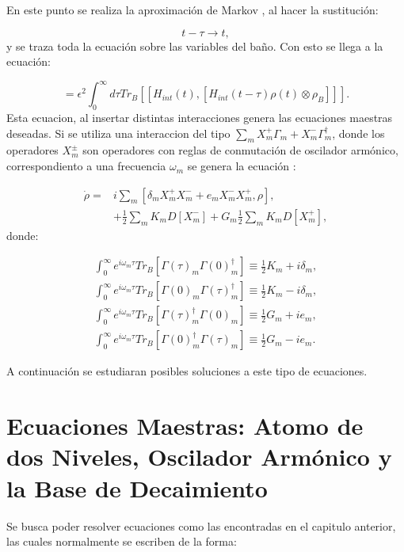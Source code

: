\documentclass[a4paper,10pt]{report}
\begin{document}
En este punto se realiza la aproximación de Markov \cite{ZollerQN}, al hacer la sustitución:

\begin{equation}
t-\tau \rightarrow t,
\end{equation} y se traza toda la ecuación sobre las variables del baño. Con esto se llega a la ecuación:

\begin{equation}
=\epsilon^2 \int_{0}^{\infty}d\tau Tr_B[[H_{int}(t),[H_{int}(t-\tau)\rho(t)\otimes\rho_B]]].
\end{equation} Esta ecuacion, al insertar distintas interacciones genera las ecuaciones maestras deseadas. Si se utiliza una interaccion del tipo $\sum_m X^+_m\Gamma_m + X^-_m\Gamma^\dagger_m$, donde los operadores $X_m^\pm$ son operadores con reglas de conmutación de oscilador armónico, correspondiento a una frecuencia $\omega_m$ se genera la ecuación \cite{ZollerQN}:

\begin{align}
\dot{\rho} =& i\sum_m [\delta_m X^+_m X^-_m + e_mX^-_mX^+_m,\rho],\\
&+ \nonumber \frac{1}{2}\sum_m K_m D[X^-_m] + G_m\frac{1}{2}\sum_m K_m D[X^+_m],
\end{align} donde:

\begin{align}
\int_0 ^\infty e^{i\omega_m \tau}Tr_B[\Gamma(\tau)_m\Gamma(0)^\dagger_m] \equiv \frac{1}{2}K_m+i\delta_m,\\
\int_0 ^\infty e^{i\omega_m \tau}Tr_B[\Gamma(0)_m\Gamma(\tau)^\dagger_m]\equiv \frac{1}{2}K_m-i\delta_m,\\
\int_0 ^\infty e^{i\omega_m \tau}Tr_B[\Gamma(\tau)^\dagger_m\Gamma(0)_m]\equiv\frac{1}{2}G_m+ie_m,\\
\int_0 ^\infty e^{i\omega_m \tau}Tr_B[\Gamma(0)^\dagger_m\Gamma(\tau)_m]\equiv\frac{1}{2}G_m-ie_m.
\end{align}

A continuación se estudiaran posibles soluciones a este tipo de ecuaciones.


\chapter{Ecuaciones Maestras: Atomo de dos Niveles, Oscilador Armónico y la Base de Decaimiento}

Se busca poder resolver ecuaciones como las encontradas en el capitulo anterior, las cuales normalmente se escriben de la forma:
\end{document}
